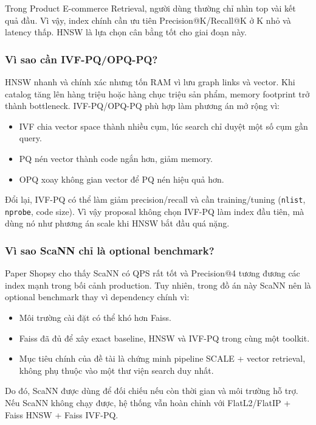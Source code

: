 \documentclass[12pt,a4paper]{article}
\begin{document}
Trong Product E-commerce Retrieval, người dùng thường chỉ nhìn top vài kết quả đầu. Vì vậy, index chính cần ưu tiên Precision@K/Recall@K ở K nhỏ và latency thấp. HNSW là lựa chọn cân bằng tốt cho giai đoạn này.

\subsubsection{Vì sao cần IVF-PQ/OPQ-PQ?}
HNSW nhanh và chính xác nhưng tốn RAM vì lưu graph links và vector. Khi catalog tăng lên hàng triệu hoặc hàng chục triệu sản phẩm, memory footprint trở thành bottleneck. IVF-PQ/OPQ-PQ phù hợp làm phương án mở rộng vì:
\begin{itemize}
  \item IVF chia vector space thành nhiều cụm, lúc search chỉ duyệt một số cụm gần query.
  \item PQ nén vector thành code ngắn hơn, giảm memory.
  \item OPQ xoay không gian vector để PQ nén hiệu quả hơn.
\end{itemize}

Đổi lại, IVF-PQ có thể làm giảm precision/recall và cần training/tuning (\texttt{nlist}, \texttt{nprobe}, code size). Vì vậy proposal không chọn IVF-PQ làm index đầu tiên, mà dùng nó như phương án scale khi HNSW bắt đầu quá nặng.

\subsubsection{Vì sao ScaNN chỉ là optional benchmark?}
Paper Shopsy cho thấy ScaNN có QPS rất tốt và Precision@4 tương đương các index mạnh trong bối cảnh production. Tuy nhiên, trong đồ án này ScaNN nên là optional benchmark thay vì dependency chính vì:
\begin{itemize}
  \item Môi trường cài đặt có thể khó hơn Faiss.
  \item Faiss đã đủ để xây exact baseline, HNSW và IVF-PQ trong cùng một toolkit.
  \item Mục tiêu chính của đề tài là chứng minh pipeline SCALE + vector retrieval, không phụ thuộc vào một thư viện search duy nhất.
\end{itemize}

Do đó, ScaNN được dùng để đối chiếu nếu còn thời gian và môi trường hỗ trợ. Nếu ScaNN không chạy được, hệ thống vẫn hoàn chỉnh với FlatL2/FlatIP + Faiss HNSW + Faiss IVF-PQ.
\end{document}
